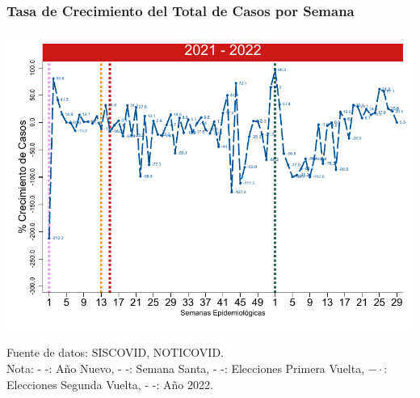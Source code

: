 \documentclass[xcolor=table]{beamer}
\begin{document}
	\begin{frame}
		\frametitle{Tasa de Crecimiento del Total de Casos por Semana}
		\vspace{-.5cm}
		\begin{center}
			\includegraphics[width=0.9\linewidth]{../figuras/positivos_crecimiento_2021_2022.pdf}
		\end{center} 
		{\tiny Fuente de datos: SISCOVID, NOTICOVID. \\
	Nota:{\color{mycolor1} - -: Año Nuevo}, {\color{mycolor2} - -: Semana Santa}, {\color{mycolor3} - -: Elecciones Primera Vuelta}, {\color{mycolor4} $- \cdot$: Elecciones Segunda Vuelta}, {\color{mycolor7} - -: Año 2022}. \\}
	\end{frame}
	
\end{document}
